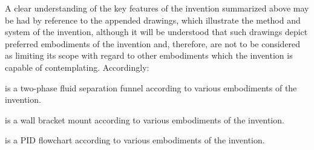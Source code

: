 
A clear understanding of the key features of the invention summarized above may be had 
by reference to the appended drawings, which illustrate the method and system of the 
invention, although it will be understood that such drawings depict preferred 
embodiments of the invention and, therefore, are not to be considered as limiting its 
scope with regard to other embodiments which the invention is capable of contemplating. 
Accordingly:


 is a two-phase fluid separation funnel according to various embodiments of the invention.

 is a wall bracket mount according to various embodiments of the invention.


 is a PID flowchart according to various embodiments of the invention.

